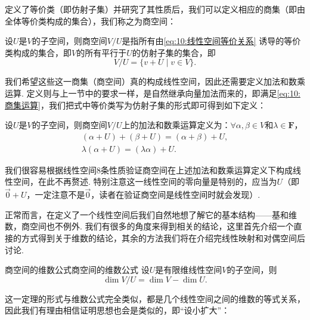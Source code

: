 定义了等价类（即仿射子集）并研究了其性质后，我们可以定义相应的商集（即由全体等价类构成的集合），我们称之为商空间：
\begin{definition}{}{}
    设$U$是$V$的子空间，则商空间$V/U$是指所有由\autoref{eq:10:线性空间等价关系} 诱导的等价类构成的集合，即$V$的所有平行于$U$的仿射子集的集合，即
    \[V/U=\{v+U \mid v\in V\}.\]
\end{definition}
我们希望这些这一商集（商空间）真的构成线性空间，因此还需要定义加法和数乘运算. 定义则与上一节中的要求一样，是自然继承向量加法而来的，即满足\autoref{eq:10:商集运算}，我们把式中等价类写为仿射子集的形式即可得到如下定义：
\begin{definition}{}{}
    设$U$是$V$的子空间，则商空间$V/U$上的加法和数乘运算定义为：$\forall \alpha,\beta\in V$和$\lambda\in\mathbf{F}$，
    \begin{gather*}
        (\alpha+U)+(\beta+U)=(\alpha+\beta)+U, \\
        \lambda(\alpha+U)=(\lambda\alpha)+U.
    \end{gather*}
\end{definition}
我们很容易根据线性空间8条性质验证商空间在上述加法和数乘运算定义下构成线性空间，在此不再赘述. 特别注意这一线性空间的零向量是特别的，应当为$U$（即$\vec{0}+U$，一定注意不是$\vec{0}$，读者在验证商空间是线性空间时就会发现）.

正常而言，在定义了一个线性空间后我们自然地想了解它的基本结构——基和维数，商空间也不例外. 我们有很多的角度来得到相关的结论，这里首先介绍一个直接的方式得到关于维数的结论，其余的方法我们将在介绍完线性映射和对偶空间后讨论.

\begin{theorem}{商空间的维数公式}{商空间的维数公式}
    设$U$是有限维线性空间$V$的子空间，则
    \[\dim V/U=\dim V-\dim U.\]
\end{theorem}

这一定理的形式与维数公式完全类似，都是几个线性空间之间的维数的等式关系，因此我们有理由相信证明思想也会是类似的，即``设小扩大''：

